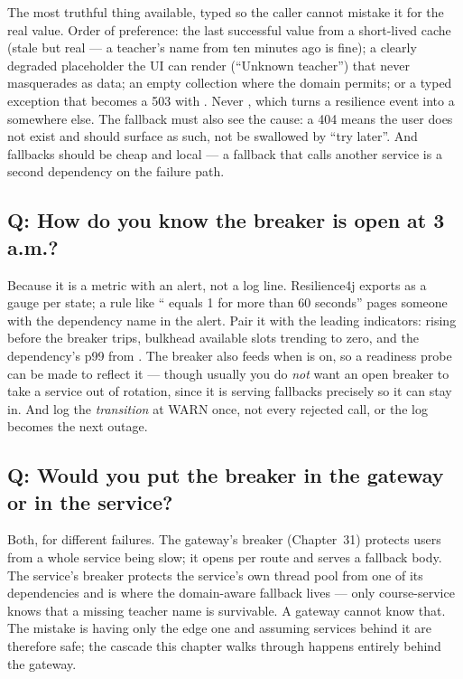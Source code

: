 The most truthful thing available, typed so the caller cannot mistake
it for the real value. Order of preference: the last successful value
from a short-lived cache (stale but real --- a teacher's name from ten
minutes ago is fine); a clearly degraded placeholder the UI can render
(``Unknown teacher'') that never masquerades as data; an empty
collection where the domain permits; or a typed exception that becomes
a 503 with . Never , which turns a
resilience event into a  somewhere else. The
fallback must also see the cause: a 404 means the user does not exist
and should surface as such, not be swallowed by ``try later''. And
fallbacks should be cheap and local --- a fallback that calls another
service is a second dependency on the failure path.

\subsection*{Q: How do you know the breaker is open at 3\,a.m.?}

Because it is a metric with an alert, not a log line. Resilience4j
exports  as a gauge per
state; a rule like `` equals 1 for more than 60
seconds'' pages someone with the dependency name in the alert. Pair it
with the leading indicators:  rising before the
breaker trips, bulkhead available slots trending to zero, and the
dependency's p99 from . The
breaker also feeds  when
 is on, so a readiness probe can be
made to reflect it --- though usually you do \emph{not} want an open
breaker to take a service out of rotation, since it is serving
fallbacks precisely so it can stay in. And log the \emph{transition}
at WARN once, not every rejected call, or the log becomes the next
outage.

\subsection*{Q: Would you put the breaker in the gateway or in the service?}

Both, for different failures. The gateway's breaker (Chapter~31)
protects users from a whole service being slow; it opens per route and
serves a fallback body. The service's breaker protects the service's
own thread pool from one of its dependencies and is where the
domain-aware fallback lives --- only course-service knows that a
missing teacher name is survivable. A gateway cannot know that. The
mistake is having only the edge one and assuming services behind it
are therefore safe; the cascade this chapter walks through happens
entirely behind the gateway.


